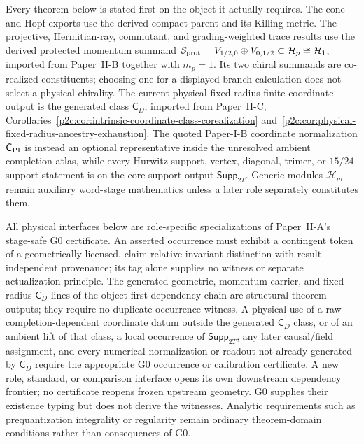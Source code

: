 \documentclass[12pt,a4paper]{article}
\begin{document}
\begin{remark}
\label{p2e:rem:v2-conditional-export-contract}
\label{p2f:rem:v2-object-first-contract}
Every theorem below is stated first on the object it actually requires.  The
cone and Hopf exports use the derived compact parent and its Killing metric.
The projective, Hermitian-ray, commutant, and grading-weighted trace results
use the derived protected momentum summand
\(\mathcal S_{\rm prot}=V_{1/2,0}\oplus V_{0,1/2}\subset\mathcal H_p\cong\mathcal H_1\), imported from
Paper~II-B together with \(m_p=1\).  Its two chiral summands are co-realized
constituents; choosing one for a displayed branch calculation does not select
a physical chirality.  The current physical fixed-radius finite-coordinate
output is the generated class \(\mathsf C_D\), imported from Paper~II-C,
Corollaries~\ref{p2c:cor:intrinsic-coordinate-class-corealization}
and~\ref{p2c:cor:physical-fixed-radius-ancestry-exhaustion}.  The quoted
Paper-I-B coordinate normalization \(\mathsf C_{\rm PI}\) is instead an optional
representative inside the unresolved ambient completion atlas, while every
Hurwitz-support, vertex, diagonal, trimer, or \(15/24\) support statement is
on the core-support output \(\mathsf{Supp}_{2T}\).  Generic modules \(\mathcal H_m\) remain auxiliary
word-stage mathematics unless a later role separately constitutes them.
\end{remark}

\begin{remark}
All physical interfaces below are role-specific specializations of Paper~II-A's
stage-safe G0 certificate.  An asserted occurrence must exhibit a contingent
token of a geometrically licensed, claim-relative invariant distinction with
result-independent provenance; its tag alone supplies no witness or separate
actualization principle.  The generated geometric, momentum-carrier, and
fixed-radius \(\mathsf C_D\) lines of the object-first dependency chain are
structural theorem outputs; they require no duplicate occurrence witness.  A physical use
of a raw completion-dependent coordinate datum outside the generated
\(\mathsf C_D\) class, or of an ambient lift of that class,
a local occurrence of \(\mathsf{Supp}_{2T}\), any later causal/field
assignment, and every numerical normalization or readout not already generated
by \(\mathsf C_D\) require the
appropriate G0 occurrence or calibration certificate.  A new role, standard,
or comparison interface opens its own downstream dependency frontier; no
certificate reopens frozen upstream geometry.  G0 supplies their existence
typing but does not derive the witnesses.  Analytic requirements such as
prequantization integrality or regularity remain ordinary theorem-domain
conditions rather than consequences of G0.
\end{remark}
\end{document}
